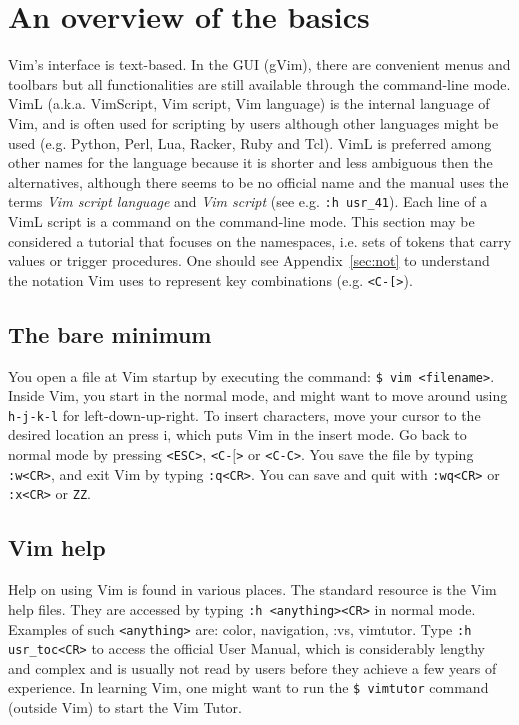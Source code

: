 \documentclass{article}
\newcommand{\ttt}[1] {
	\texttt{<#1>}}
\newcommand{\tttt}[1]{\texttt{#1}}
\begin{document}
\section{An overview of the basics}\label{basics}
Vim's interface is text-based.
In the GUI (gVim),
there are convenient menus and toolbars
but all functionalities are still available through
the command-line mode.
VimL (a.k.a. VimScript, Vim script, Vim language)
is the internal language of Vim,
and is often used for scripting by users
although other languages might be used 
(e.g. Python, Perl, Lua, Racker, Ruby and Tcl). 
VimL is preferred among other names for the language
because it is shorter and less ambiguous then the alternatives,
although there seems to be no official name and the manual
uses the terms \emph{Vim script language} and \emph{Vim script}
(see e.g. \tttt{:h usr\_41}).
Each line of a VimL script is a command on the
command-line mode.
This section may be considered a tutorial
that focuses on the namespaces, i.e. sets of tokens
that carry values or trigger procedures.
One should see Appendix~\ref{sec:not}
to understand the notation Vim uses to represent key combinations
(e.g. \ttt{C-[}).

\subsection{The bare minimum}\label{minimum}
You open a file at Vim startup by executing
the command: \texttt{\$ vim <filename>}.
Inside Vim, you start in the normal
mode, and might want to move around using
\texttt{h-j-k-l} for left-down-up-right.
To insert characters, move your
cursor to the desired location an press i,
which puts Vim in the insert mode.
Go back to normal mode by pressing
\texttt{<ESC>}, \ttt{C-$[$} or \texttt{<C-C>}.
You save the file by typing \texttt{:w<CR>},
and exit Vim by typing \texttt{:q<CR>}.
You can save and quit with \tttt{:wq<CR>}
or \tttt{:x<CR>} or \tttt{ZZ}.

\subsection{Vim help}
Help on using Vim is found in various places.
The standard resource is the Vim help files.
They are accessed by typing \texttt{:h <anything><CR>}
in normal mode.
Examples of such \texttt{<anything>} are:
color, navigation, :vs, vimtutor.
Type 
\texttt{:h usr\_toc<CR>}
to access the official User Manual,
which is considerably lengthy and complex
and is usually not read by users before they achieve a few years
of experience.
In learning Vim, one
might want to run the \texttt{\$ vimtutor} command
(outside Vim) to start the Vim Tutor.
\end{document}
